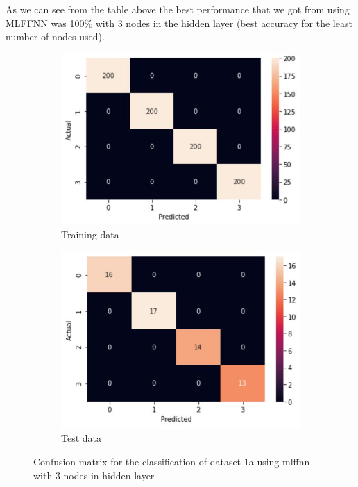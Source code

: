 \documentclass[11pt]{article}
\begin{document}
As we can see from the table above the best performance that we got from using MLFFNN was 100\% with 3 nodes in the hidden layer (best accuracy for the least number of nodes used).

\begin{figure}[h]
\centering
	\begin{subfigure}[b]{0.45\textwidth}
	\centering
	\includegraphics[scale=0.5]{dataset1a_mlffnn_cm_train.jpg}
	\caption{Training data}
	\label{fig:fig1.2.1.1}
	\end{subfigure}
	\begin{subfigure}[b]{0.45\textwidth}
	\centering
	\includegraphics[scale=0.5]{dataset1a_mlffnn_cm_test.jpg}
	\caption{Test data}
	\label{fig:fig1.2.1.2}
	\end{subfigure}
\caption{Confusion matrix for the classification of dataset 1a using mlffnn with 3 nodes in hidden layer}
\label{fig:fig1.2.1}
\end{figure}
\end{document}
